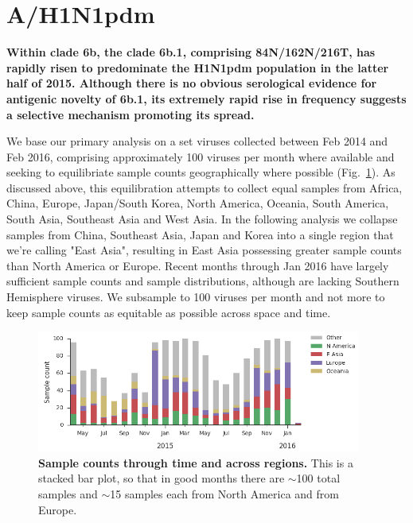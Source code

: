 \documentclass[11pt,oneside,letterpaper]{article}
\begin{document}
\clearpage
\pagebreak

\section*{A/H1N1pdm}

\textbf{Within clade 6b, the clade 6b.1, comprising 84N/162N/216T, has rapidly risen to predominate the H1N1pdm population in the latter half of 2015. Although there is no obvious serological evidence for antigenic novelty of 6b.1, its extremely rapid rise in frequency suggests a selective mechanism promoting its spread.}

We base our primary analysis on a set viruses collected between Feb 2014 and Feb 2016, comprising approximately 100 viruses per month where available and seeking to equilibriate sample counts geographically where possible (Fig.\ \ref{H1N1pdm_counts}). As discussed above, this equilibration attempts to collect equal samples from Africa, China, Europe, Japan/South Korea, North America, Oceania, South America, South Asia, Southeast Asia and West Asia. In the following analysis we collapse samples from China, Southeast Asia, Japan and Korea into a single region that we're calling "East Asia", resulting in East Asia possessing greater sample counts than North America or Europe. Recent months through Jan 2016 have largely sufficient sample counts and sample distributions, although are lacking Southern Hemisphere viruses. We subsample to 100 viruses per month and not more to keep sample counts as equitable as possible across space and time.

\begin{figure}[H]
	\centering		
	\includegraphics[width=0.95\textwidth]{../figures/feb-2016/H1N1pdm_counts.png}
	\caption{\textbf{Sample counts through time and across regions.}
	This is a stacked bar plot, so that in good months there are $\sim$100 total samples and $\sim$15 samples each from North America and from Europe.	
	}
	\label{H1N1pdm_counts}
\end{figure}
\end{document}
